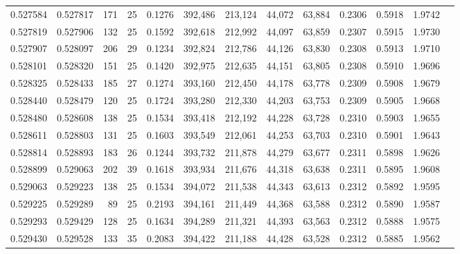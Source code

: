 \begin{tabular}{rrrrrrrrrrrrr}
0.527584 & 0.527817 &   171 &  25 &                                     0.1276 & 392,486 & 213,124 &  44,072 &  63,884 & 0.2306 & 0.5918 & 1.9742 \\
0.527819 & 0.527906 &   132 &  25 &                                     0.1592 & 392,618 & 212,992 &  44,097 &  63,859 & 0.2307 & 0.5915 & 1.9730 \\
0.527907 & 0.528097 &   206 &  29 &                                     0.1234 & 392,824 & 212,786 &  44,126 &  63,830 & 0.2308 & 0.5913 & 1.9710 \\
0.528101 & 0.528320 &   151 &  25 &                                     0.1420 & 392,975 & 212,635 &  44,151 &  63,805 & 0.2308 & 0.5910 & 1.9696 \\
0.528325 & 0.528433 &   185 &  27 &                                     0.1274 & 393,160 & 212,450 &  44,178 &  63,778 & 0.2309 & 0.5908 & 1.9679 \\
0.528440 & 0.528479 &   120 &  25 &                                     0.1724 & 393,280 & 212,330 &  44,203 &  63,753 & 0.2309 & 0.5905 & 1.9668 \\
0.528480 & 0.528608 &   138 &  25 &                                     0.1534 & 393,418 & 212,192 &  44,228 &  63,728 & 0.2310 & 0.5903 & 1.9655 \\
0.528611 & 0.528803 &   131 &  25 &                                     0.1603 & 393,549 & 212,061 &  44,253 &  63,703 & 0.2310 & 0.5901 & 1.9643 \\
0.528814 & 0.528893 &   183 &  26 &                                     0.1244 & 393,732 & 211,878 &  44,279 &  63,677 & 0.2311 & 0.5898 & 1.9626 \\
0.528899 & 0.529063 &   202 &  39 &                                     0.1618 & 393,934 & 211,676 &  44,318 &  63,638 & 0.2311 & 0.5895 & 1.9608 \\
0.529063 & 0.529223 &   138 &  25 &                                     0.1534 & 394,072 & 211,538 &  44,343 &  63,613 & 0.2312 & 0.5892 & 1.9595 \\
0.529225 & 0.529289 &    89 &  25 &                                     0.2193 & 394,161 & 211,449 &  44,368 &  63,588 & 0.2312 & 0.5890 & 1.9587 \\
0.529293 & 0.529429 &   128 &  25 &                                     0.1634 & 394,289 & 211,321 &  44,393 &  63,563 & 0.2312 & 0.5888 & 1.9575 \\
0.529430 & 0.529528 &   133 &  35 &                                     0.2083 & 394,422 & 211,188 &  44,428 &  63,528 & 0.2312 & 0.5885 & 1.9562 \\

\end{tabular}
